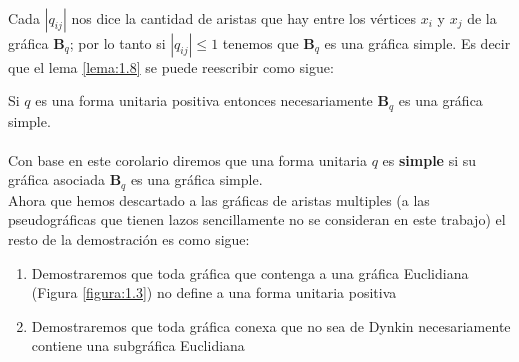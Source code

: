 \paragraph{}
Cada $|q_{ij}|$ nos dice la cantidad de aristas que hay entre los vértices $x_{i}$ y $x_{j}$ de la gráfica $\textbf{B}_{q}$; por lo tanto si $|q_{ij}| \leq 1$ tenemos que $\textbf{B}_{q}$ es una gráfica simple. Es decir que el lema \ref{lema:1.8} se puede reescribir como sigue:

\begin{corollary}
Si $q$ es una forma unitaria positiva entonces necesariamente $\textbf{B}_{q}$ es una gráfica simple.
\label{corolario:1.9}
\end{corollary}

\paragraph{}
Con base en este corolario diremos que una forma unitaria $q$ es \textbf{simple} si su gráfica asociada $\textbf{B}_{q}$ es una gráfica simple.\\
Ahora que hemos descartado a las gráficas de aristas multiples (a las pseudográficas que tienen lazos sencillamente no se consideran en este trabajo) el resto de la demostración es como sigue:

\begin{enumerate}
    \item Demostraremos que toda gráfica que contenga a una gráfica Euclidiana (Figura \ref{figura:1.3}) no define a una forma unitaria positiva
    \item Demostraremos que toda gráfica conexa que no sea de Dynkin necesariamente contiene una subgráfica Euclidiana
\end{enumerate}

